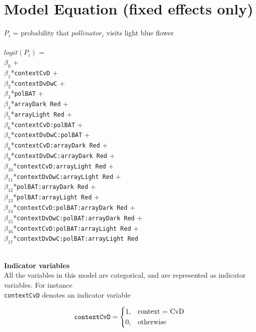 \documentclass{article}
\begin{document}
\section{Model Equation (fixed effects only)}
$P_i$ = probability that $pollinator_i$ visits light blue flower
\\ 
\\
\noindent
$logit(P_i)$ =  \\ 
$\beta_0$ + \\ 
$\beta_1$*\texttt{contextCvD} +  \\ 
$\beta_2$*\texttt{contextDvDwC} +  \\
$\beta_3$*\texttt{polBAT} + \\ 
$\beta_4$*\texttt{arrayDark Red} + \\  
$\beta_5$*\texttt{arrayLight Red} +  \\ 
$\beta_6$*\texttt{contextCvD:polBAT} + \\ 
$\beta_7$*\texttt{contextDvDwC:polBAT} +  \\ 
$\beta_8$*\texttt{contextCvD:arrayDark Red} + \\ 
$\beta_9$*\texttt{contextDvDwC:arrayDark Red} + \\ 
$\beta_{10}$*\texttt{contextCvD:arrayLight Red} + \\
$\beta_{11}$*\texttt{contextDvDwC:arrayLight Red} +  \\ 
$\beta_{12}$*\texttt{polBAT:arrayDark Red} +   \\ 
$\beta_{13}$*\texttt{polBAT:arrayLight Red} + \\ 
$\beta_{14}$*\texttt{contextCvD:polBAT:arrayDark Red} + \\   $\beta_{15}$*\texttt{contextDvDwC:polBAT:arrayDark Red} + \\   $\beta_{16}$*\texttt{contextCvD:polBAT:arrayLight Red} + \\ 
$\beta_{17}$*\texttt{contextDvDwC:polBAT:arrayLight Red}



\noindent
\\
\textbf{Indicator variables} \\
All the variables in this model are categorical, and are represented as indicator variables.  For instance \\

\noindent
\texttt{contextCvD} denotes an indicator variable 

\[
    \texttt{contextCvD} = 
\begin{dcases}
	1 ,& \text{context = CvD}  \\     
    0, & \text{otherwise}
\end{dcases}
\]
\end{document}
